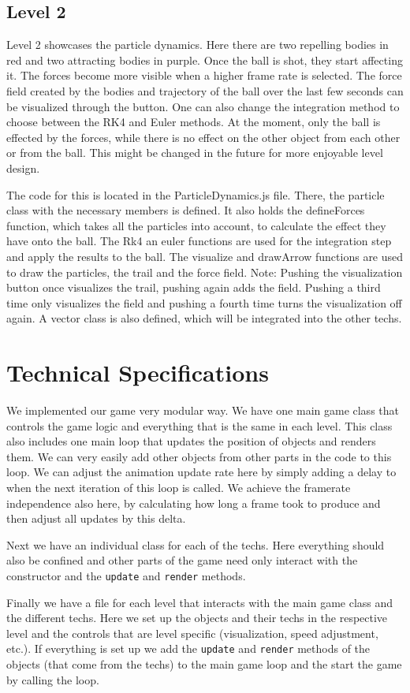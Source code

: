 \documentclass{article}
\begin{document}
\subsection{Level 2}
Level 2 showcases the particle dynamics. Here there are two repelling bodies in red and two attracting bodies in purple. Once the ball is shot, they start affecting it. The forces become more visible when a higher frame rate is selected. The force field created by the bodies and trajectory of the ball over the last few seconds can be visualized through the button. One can also change the integration method to choose between the RK4 and Euler methods. At the moment, only the ball is effected by the forces, while there is no effect on the other object from each other or from the ball. This might be changed in the future for more enjoyable level design. \newline

The code for this is located in the ParticleDynamics.js file. There, the particle class with the necessary members is defined. It also holds the defineForces function, which takes all the particles into account, to calculate the effect they have onto the ball. The Rk4 an euler functions are used for the integration step and apply the results to the ball. The visualize and drawArrow functions are used to draw the particles, the trail and the force field. 
Note: Pushing the visualization button once visualizes the trail, pushing again adds the field. Pushing a third time only visualizes the field and pushing a fourth time turns the visualization off again. 
A vector class is also defined, which will be integrated into the other techs. 
\section{Technical Specifications}

We implemented our game very modular way. We have one main game class that controls the game logic 
and everything that is the same in each level. This class also includes one main loop that 
updates the position of objects and renders them. We can very easily add other objects from other parts in the 
code to this loop. We can adjust the animation update rate here 
by simply adding a delay to when the next iteration of this loop is called. 
We achieve the framerate independence also here, by calculating how long a frame took to produce 
and then adjust all updates by this delta. 

Next we have an individual class for each of the techs. Here everything should 
also be confined and other parts of the game need only interact with the constructor
and the \texttt{update} and \texttt{render} methods.

Finally we have a file for each level that interacts with the main game 
class and the different techs. Here we set up
the objects and their techs in the respective level and the controls that are level specific (visualization, speed adjustment, etc.).
If everything is set up we add the \texttt{update} and \texttt{render} methods of the objects (that come from the techs) 
to the main game loop and the start the game by calling the loop.
\end{document}
